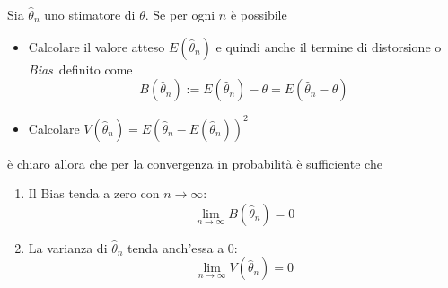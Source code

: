 \documentclass[a4paper]{report}
\newcounter{def}
\theoremstyle{remark}
\begin{document}
Sia $\widehat{\theta }_{n}$ uno stimatore di $\theta $. Se per ogni $n$ \`{e}
possibile

\begin{itemize}
\item Calcolare il valore atteso $E(\widehat{\theta }_{n})$ e quindi anche
il termine di distorsione o \emph{Bias}\ definito come%
\begin{equation*}
B(\widehat{\theta }_{n}):=E(\widehat{\theta }_{n})-\theta =E(\widehat{\theta 
}_{n}-\theta )
\end{equation*}

\item Calcolare $V(\widehat{\theta }_{n})=E\left( \widehat{\theta }_{n}-E(%
\widehat{\theta }_{n})\right) ^{2}$
\end{itemize}

\noindent \`{e} chiaro allora che per la convergenza in probabilit\`{a} \`{e}
sufficiente che

\begin{enumerate}
\item Il Bias tenda a zero con $n\rightarrow \infty :$%
\begin{equation}
\lim_{n\rightarrow \infty }B(\widehat{\theta }_{n})=0  \label{bias_n}
\end{equation}

\item La varianza di $\widehat{\theta }_{n}$ tenda anch'essa a 0:%
\begin{equation}
\lim_{n\rightarrow \infty }V(\widehat{\theta }_{n})=0  \label{var_n}
\end{equation}
\end{enumerate}
\end{document}
